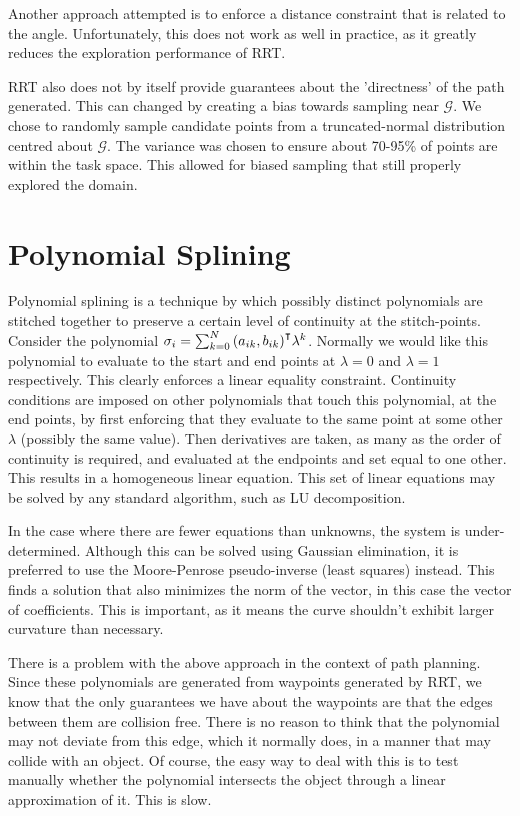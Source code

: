 \documentclass[oneside, 11pt]{book}
\begin{document}
Another approach attempted is to enforce a distance constraint that is related to the angle. Unfortunately, this does not work as well in practice, as it greatly reduces the exploration performance of RRT.

RRT also does not by itself provide guarantees about the 'directness' of the path generated. This can changed by creating a bias towards sampling near $\mathcal{G}$\cite{LaValle06}\cite{Yang14}. We chose to randomly sample candidate points from a truncated-normal distribution centred about $\mathcal{G}$. The variance was chosen to ensure about 70-95\% of points are within the task space. This allowed for biased sampling that still properly explored the domain.

\section{Polynomial Splining}
Polynomial splining is a technique by which possibly distinct polynomials are stitched together to preserve a certain level of continuity at the stitch-points. Consider the polynomial $\sigma_i = \sum_{k=0}^N{{(a_{ik},b_{ik})}^{\intercal}\lambda^k}$. Normally we would like this polynomial to evaluate to the start and end points at $\lambda=0$ and $\lambda=1$ respectively. This clearly enforces a linear equality constraint. Continuity conditions are imposed on other polynomials that touch this polynomial, at the end points, by first enforcing that they evaluate to the same point at some other $\lambda$ (possibly the same value). Then derivatives are taken, as many as the order of continuity is required, and evaluated at the endpoints and set equal to one other. This results in a homogeneous linear equation. This set of linear equations may be solved by any standard algorithm, such as LU decomposition.

In the case where there are fewer equations than unknowns, the system is under-determined. Although this can be solved using Gaussian elimination, it is preferred to use the Moore-Penrose pseudo-inverse (least squares) instead. This finds a solution that also minimizes the norm of the vector, in this case the vector of coefficients. This is important, as it means the curve shouldn't exhibit larger curvature than necessary.

There is a problem with the above approach in the context of path planning. Since these polynomials are generated from waypoints generated by RRT, we know that the only guarantees we have about the waypoints are that the edges between them are collision free. There is no reason to think that the polynomial may not deviate from this edge, which it normally does, in a manner that may collide with an object. Of course, the easy way to deal with this is to test manually whether the polynomial intersects the object through a linear approximation of it. This is slow.
\end{document}
